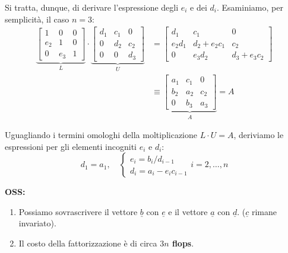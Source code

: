 Si tratta, dunque, di derivare l'espressione degli $e_i$ e dei $d_i$. Esaminiamo, per semplicità, il caso $n=3$:
\begin{align*}
    \underbrace{\begin{bmatrix} 1 & 0 & 0 \\ e_2 & 1 & 0 \\ 0 & e_3 & 1 \end{bmatrix}}_{L} \cdot \underbrace{\begin{bmatrix} d_1 & c_1 & 0 \\ 0 & d_2 & c_2 \\ 0 & 0 & d_3 \end{bmatrix}}_{U} &= \begin{bmatrix} d_1 & c_1 & 0 \\ e_2 d_1 & d_2 + e_2 c_1 & c_2 \\ 0 & e_3 d_2 & d_3 + e_3 c_2 \end{bmatrix} \\
    &\equiv \underbrace{\begin{bmatrix} a_1 & c_1 & 0 \\ b_2 & a_2 & c_2 \\ 0 & b_3 & a_3 \end{bmatrix}}_{A} = A
\end{align*}

Uguagliando i termini omologhi della moltiplicazione $L \cdot U = A$, deriviamo le espressioni per gli elementi incogniti $e_i$ e $d_i$:
\begin{equation} \label{eq:14}
d_1 = a_1, \quad \begin{cases} e_i = b_i / d_{i-1} \\ d_i = a_i - e_i c_{i-1} \end{cases} i=2, \dots, n
\end{equation}

\textbf{OSS:} 
\begin{enumerate}
    \item Possiamo sovrascrivere il vettore $\underline{b}$ con $\underline{e}$ e il vettore $\underline{a}$ con $\underline{d}$. ($\underline{c}$ rimane invariato).
    \item Il costo della fattorizzazione è di circa \textbf{$3n$ flops}.
\end{enumerate}

